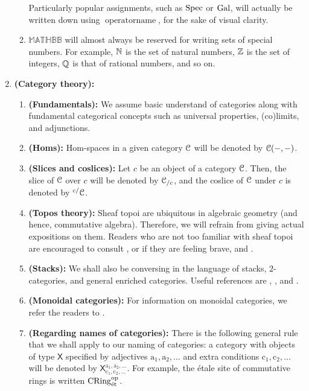 \begin{enumerate}
\begin{enumerate}
                Particularly popular assignments, such as $\mathrm{Spec}$ or $\mathrm{Gal}$, will actually be written down using $\operatorname{operatorname}$, for the sake of visual clarity.
                \item $\mathbb{MATHBB}$ will almost always be reserved for writing sets of special numbers. For example, $\mathbb{N}$ is the set of natural numbers, $\mathbb{Z}$ is the set of integers, $\mathbb{Q}$ is that of rational numbers, and so on. 
            \end{enumerate}
        \item \textbf{(Category theory):} 
            \begin{enumerate}
                \item \textbf{(Fundamentals):} We assume basic understand of categories along with fundamental categorical concepts such as universal properties, (co)limits, and adjunctions. 
                \item \textbf{(Homs):} Hom-spaces in a given category $\mathcal{C}$ will be denoted by $\mathcal{C}(-, -)$.
                \item \textbf{(Slices and coslices):} Let $c$ be an object of a category $\mathcal{C}$. Then, the slice of $\mathcal{C}$ over $c$ will be denoted by $\mathcal{C}_{/c}$, and the coslice of $\mathcal{C}$ under $c$ is denoted by ${}^{c/}\mathcal{C}$. 
                \item \textbf{(Topos theory):} Sheaf topoi are ubiquitous in algebraic geometry (and hence, commutative algebra). Therefore, we will refrain from giving actual expositions on them. Readers who are not too familiar with sheaf topoi are encouraged to consult \cite{sga4}, or if they are feeling brave, \cite{elephant1} and \cite{elephant2}. 
                \item \textbf{(Stacks):} We shall also be conversing in the language of stacks, $2$-categories, and general enriched categories. Useful references are \cite{vistoli_descent}, \cite{leinster_higher_categories}, and \cite{kelly_enriched_categories}.
                \item \textbf{(Monoidal categories):} For information on monoidal categories, we refer the readers to \cite{EGNO}.
                \item \textbf{(Regarding names of categories):} There is the following general rule that we shall apply to our naming of categories: a category with objects of type $\mathsf{X}$ specified by adjectives $\mathrm{a_1, a_2, ...}$ and extra conditions $\mathrm{c_1, c_2, ...}$ will be denoted by $\mathsf{X}^{\mathrm{a_1, a_2, ...}}_{\mathrm{c_1, c_2, ...}}$. For example, the \'etale site of commutative rings is written $\mathrm{CRing}^{\mathrm{op}}_{\mathrm{\acute{e}t}}$. 
                

\end{enumerate}
\end{enumerate}
